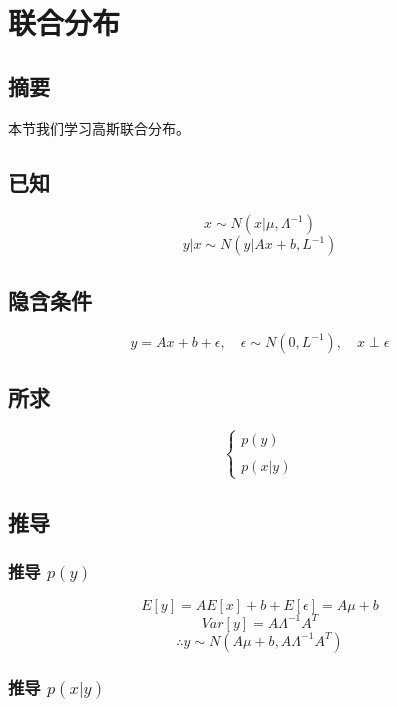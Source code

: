\documentclass{report}
\begin{document}
\chapter{联合分布}
\section{摘要}
本节我们学习高斯联合分布。
\section{已知}
$$
x \sim N(x|\mu, \Lambda^{-1})
$$
$$
y|x \sim N(y|Ax+b, L^{-1})
$$
\section{隐含条件}
$$
y = Ax+b+\epsilon, \quad \epsilon \sim N(0, L^{-1}), \quad x \perp \epsilon
$$
\section{所求}
$$
\begin{cases}
p(y)\\
\\
p(x|y)
\end{cases}
$$
\section{推导}
\subsection{推导 $p(y)$}
$$
E[y] = A E[x] + b + E[\epsilon]=A \mu + b
$$
$$
Var[y] = A \Lambda^{-1} A^T
$$
$$
\therefore y \sim N(A\mu +b, A\Lambda^{-1} A^T)
$$
\subsection{推导 $p(x|y)$}
\end{document}
